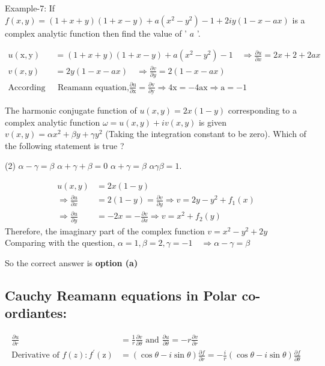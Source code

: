 	\begin{exercise}
		Example-7: If $f(x, y)=(1+x+y)(1+x-y)+a\left(x^{2}-y^{2}\right)-1+2 i y(1-x-a x)$ is a complex analytic function then find the value of ' $a$ '.
	\end{exercise}
	\begin{answer}
		\begin{align*}
		u(\mathrm{x}, \mathrm{y})&=(1+x+y)(1+x-y)+a\left(x^{2}-y^{2}\right)-1 \quad \Rightarrow \frac{\partial u}{\partial x}=2 x+2+2 a x \\
		v(x, y)&=2 y(1-x-a x) \quad \Rightarrow \frac{\partial v}{\partial y}=2(1-x-a x)\\
		\text{According to Cauchy  }&\text{ Reamann equation,}\frac{\partial \mathrm{u}}{\partial \mathrm{x}}=\frac{\partial \mathrm{v}}{\partial \mathrm{y}} \Rightarrow 4 \mathrm{x}=-4 \mathrm{ax} \Rightarrow \mathrm{a}=-1
		\end{align*}
	\end{answer}
	\begin{exercise}
		The harmonic conjugate function of $u(x, y)=2 x(1-y)$ corresponding to a complex analytic function $\omega=u(x, y)+i v(x, y)$ is given $v(x, y)=\alpha x^{2}+\beta y+\gamma y^{2}$ (Taking the integration constant to be zero).
		Which of the following statement is true ?
		 \begin{tasks}(2)
			\task[\textbf{a.}]$\alpha-\gamma=\beta$
			\task[\textbf{b.}]$\alpha+\gamma+\beta=0$
			\task[\textbf{c.}]$\alpha+\gamma=\beta$
			\task[\textbf{d.}] $\alpha \gamma \beta=1$.
		\end{tasks}
	\end{exercise}
	\begin{answer}
		\begin{align*}
		u(x, y)&=2 x(1-y) \\
		\Rightarrow \frac{\partial u}{\partial x}&=2(1-y)=\frac{\partial v}{\partial y} \Rightarrow v=2 y-y^{2}+f_{1}(x) \\
		\Rightarrow \frac{\partial u}{\partial y}&=-2 x=-\frac{\partial v}{\partial x} \Rightarrow v=x^{2}+f_{2}(y)
		\end{align*}
			Therefore, the imaginary part of the complex function $v=x^{2}-y^{2}+2 y$ \\Comparing with the question, $\alpha=1, \beta=2, \gamma=-1 \quad \Rightarrow \alpha-\gamma=\beta$
	\end{answer}
	So the correct answer is \textbf{option (a)}
	\subsection{Cauchy Reamann equations in Polar co-ordiantes:}
	\begin{answer}
		\begin{align*}
		\frac{\partial u}{\partial r}&=\frac{1}{r} \frac{\partial v}{\partial \theta} \text { and } \frac{\partial u}{\partial \theta}=-r \frac{\partial v}{\partial r}\\
		\text{Derivative of }f(z): f^{\prime}(\mathrm{z})&=(\cos \theta-i \sin \theta) \frac{\partial f}{\partial r}=-\frac{i}{r}(\cos \theta-i \sin \theta) \frac{\partial f}{\partial \theta}
		\end{align*}
	\end{answer}
